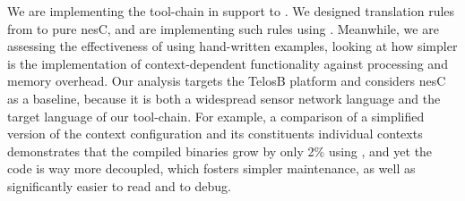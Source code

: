 We are implementing the tool-chain in support to \conesc. We designed
translation rules from \conesc to pure nesC, and are implementing such
rules using {}. Meanwhile, we are assessing the effectiveness of
\conesc using hand-written examples, looking at how simpler is the
implementation of context-dependent functionality against processing
and memory overhead. Our analysis targets the TelosB platform and
considers nesC as a baseline, because it is both a widespread sensor
network language and the target language of our tool-chain. For
example, a comparison of a simplified version of the
{} context configuration and its constituents
individual contexts demonstrates that the compiled binaries grow by
only 2\% using \conesc, and yet the code is way more decoupled, which
fosters simpler maintenance, as well as significantly easier to read
and to debug.







